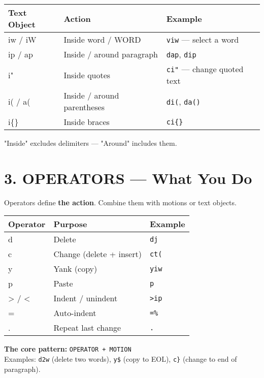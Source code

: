 \documentclass[landscape,11pt]{article}
\begin{document}
\begin{multicols}{2}
\renewcommand{\arraystretch}{1.1}
\begin{tabularx}{\linewidth}{@{}>{\ttfamily}l>{\raggedright\arraybackslash}X>{\raggedright\arraybackslash}X@{}}
\normalfont\textbf{Text Object} & \textbf{Action} & \textbf{Example}\\
\hline
iw / iW & Inside word / WORD & \texttt{viw} — select a word\\
ip / ap & Inside / around paragraph & \texttt{dap}, \texttt{dip}\\
i" & Inside quotes & \texttt{ci"} — change quoted text\\
i( / a( & Inside / around parentheses & \texttt{di(}, \texttt{da()}\\
i\{\} & Inside braces & \texttt{ci\{\}}\\
\end{tabularx}
\renewcommand{\arraystretch}{1}

\vspace{2mm}
\begin{tcolorbox}[colback=YellowOrange!8, colframe=YellowOrange, boxsep=2pt, arc=1pt, fontupper=\small\itshape]
"Inside" excludes delimiters — "Around" includes them.
\end{tcolorbox}

\section*{\textcolor{BrickRed}{3. OPERATORS — What You Do}}
Operators define \textbf{the action}. Combine them with motions or text objects.

\renewcommand{\arraystretch}{1.1}
\begin{tabularx}{\linewidth}{@{}>{\ttfamily}l>{\raggedright\arraybackslash}X>{\raggedright\arraybackslash}X@{}}
\normalfont\textbf{Operator} & \textbf{Purpose} & \textbf{Example}\\
\hline
d & Delete & \texttt{dj}\\
c & Change (delete + insert) & \texttt{ct(}\\
y & Yank (copy) & \texttt{yiw}\\
p & Paste & \texttt{p}\\
> / < & Indent / unindent & \texttt{>ip}\\
= & Auto-indent & \texttt{=\%}\\
. & Repeat last change & \texttt{.}\\
\end{tabularx}
\renewcommand{\arraystretch}{1}

\vspace{2mm}
\begin{tcolorbox}[colback=BrickRed!8, colframe=BrickRed, boxsep=2pt, arc=1pt, fontupper=\small]
\textbf{The core pattern:} \texttt{OPERATOR + MOTION}\\[1mm]
Examples: \texttt{d2w} (delete two words), \texttt{y\$} (copy to EOL), \texttt{c\}} (change to end of paragraph).
\end{tcolorbox}


\end{multicols}
\end{document}
